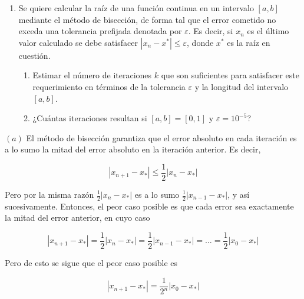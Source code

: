 \documentclass[12pt]{article}
\begin{document}
\pagebreak

\begin{myframe}
    \begin{enumerate}
    \item[2.] Se quiere calcular la raíz de una función continua en un intervalo $[a, b]$ mediante el método de bisección, de forma tal que el error cometido no exceda una tolerancia prefijada denotada por $\varepsilon$. Es decir, si $x_n$ es el último valor calculado se debe satisfacer $|x_n - x^*| \leq \varepsilon$, donde $x^*$ es la raíz en cuestión.
    
    \begin{enumerate}
        \item[a)] Estimar el número de iteraciones $k$ que son suficientes para satisfacer este requerimiento en términos de la tolerancia $\varepsilon$ y la longitud del intervalo $[a, b]$.
        \item[b)] ¿Cuántas iteraciones resultan si $[a, b] = [0, 1]$ y $\varepsilon = 10^{-5}$?
    \end{enumerate}
\end{enumerate}
\end{myframe}

$(a)$ El método de bisección garantiza que el error absoluto en cada iteración
es a lo sumo la mitad del error absoluto en la iteración anterior. Es decir, 

\begin{equation*}
    \left| x_{n+1} - x_* \right| \leq \frac{1}{2} \left| x_n - x_* \right|
\end{equation*}

Pero por la misma razón $\frac{1}{2}\left| x_n - x_* \right| $ es a lo sumo
$\frac{1}{2}\left| x_{n-1} - x_* \right| $, y así sucesivamente. Entonces, el
peor caso posible es que cada error sea exactamente la mitad del error anterior,
en cuyo caso 

\begin{equation*}
    \left| x_{n+1} - x_* \right| = \frac{1}{2}\left| x_n - x_* \right| =
    \frac{1}{2} \left| x_{n-1} - x_* \right| = \ldots = \frac{1}{2}\left| x_0 -
    x_*\right| 
\end{equation*}

Pero de esto se sigue que el peor caso posible es 

\begin{equation*}
    \left| x_{n+1} - x_* \right| = \frac{1}{2^n} \left| x_0 - x_* \right|
\end{equation*}
\end{document}
